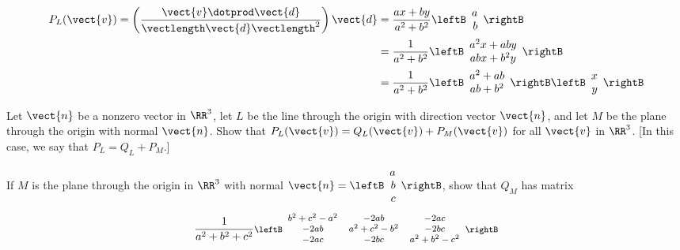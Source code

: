 \begin{multicols}{2}
\begin{ex}
\begin{sol}
\begin{enumerate}[label={\alph*.}]
\begin{align*}
P_{L}(\vect{v}) = \left(\frac{\vect{v} \dotprod \vect{d}}{\vectlength \vect{d} \vectlength^2}\right)\vect{d} & = \frac{ax + by}{a^2 + b^2}\leftB
\begin{array}{r}
a\\
b
\end{array}
\rightB  \\
&  = \frac{1}{a^2 + b^2}\leftB
\begin{array}{c}
a^2x + aby\\
abx + b^2y
\end{array}
\rightB \\
& = \frac{1}{a^2 + b^2}\leftB
\begin{array}{c}
a^2 + ab\\
ab + b^2
\end{array}
\rightB \leftB
\begin{array}{r}
x\\
y
\end{array}
\rightB
\end{align*}

\end{enumerate}
\end{sol}
\end{ex}

\begin{ex}
Let $\vect{n}$ be a nonzero vector in $\RR^3$, let $L$ be the line through the origin with direction vector $\vect{n}$, and let $M$ be the plane through the origin with normal $\vect{n}$. Show that $P_{L}(\vect{v}) = Q_{L}(\vect{v}) + P_{M}(\vect{v})$ for all $\vect{v}$ in $\RR^3$. [In this case, we say that $P_{L} = Q_{L} + P_{M}$.]
\end{ex}

\begin{ex}
If $M$ is the plane through the origin in $\RR^3$ with normal $\vect{n} = \leftB
\begin{array}{r}
a\\
b\\
c 
\end{array}
\rightB$, show that $Q_{M}$ has matrix
\begin{equation*}{\small
\frac{1}{a^2 + b^2 + c^2}}{\footnotesize \leftB
\begin{array}{ccc}
b^2 + c^2 - a^2 & -2ab & -2ac \\
-2ab & a^2 + c^2 - b^2 & -2bc \\
-2ac & -2bc & a^2 + b^2 - c^2
\end{array}
\rightB}
\end{equation*}
\end{ex}
\end{multicols}
